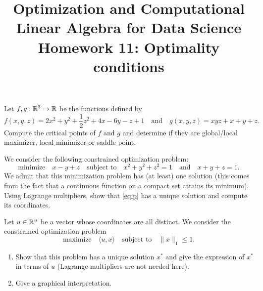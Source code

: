 \documentclass[11pt,nocut]{article}
\title{\vspace{-2.0cm}%
	Optimization and Computational Linear Algebra for Data Science\\
Homework 11: Optimality conditions}
\begin{document}
\maketitle


\vspace{1mm}

\begin{problem}[2 points]
	Let $f,g: \mathbb{R}^3 \to \mathbb{R}$ be the functions defined by
	$$
	f(x,y,z) = 2x^2 + y^2 + \frac{1}{2} z^2 + 4x - 6y - z + 1
	\quad \text{and} \quad
	g(x,y,z) = xyz + x+y+z .
	$$
	Compute the critical points of $f$ and $g$ and determine if they are global/local maximizer, local minimizer or saddle point.
\end{problem}

\vspace{5mm}

\begin{problem}[3 points]
	We consider the following constrained optimization problem:
	\begin{equation}\label{eq:p}
	\text{minimize} \quad x-y+z \quad \text{subject to} \quad x^2 + y^2 + z^2=1 \quad \text{and} \quad x+y+z=1.
	\end{equation}
	We admit that this minimization problem has (at least) one solution (this comes from the fact that a continuous function on a compact set attains its minimum).
	\\

		Using Lagrange multipliers, show that \eqref{eq:p} has a unique solution and compute its coordinates.
\end{problem}

\vspace{5mm}

\begin{problem}[2 points]
	Let $u \in \mathbb{R}^n$ be a vector whose coordinates are all distinct. We consider the constrained optimization problem
	$$
	\text{maximize} \quad \langle u ,x \rangle \quad \text{subject to} \quad \|x\|_1 \leq 1.
	$$
	\begin{enumerate}[label=\normalfont(\textbf{\alph*})]
		\item Show that this problem has a unique solution $x^*$ and give the expression of $x^*$ in terms of $u$ (Lagrange multipliers are not needed here).
		\item Give a graphical interpretation.
	\end{enumerate}
\end{problem}

\newpage
\end{document}
